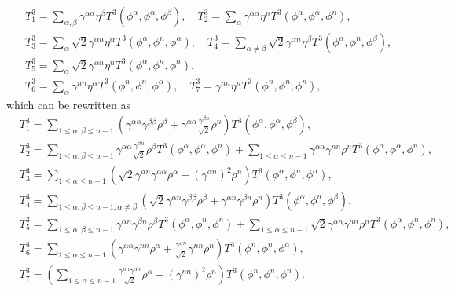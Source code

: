 \documentclass[12pt]{article}
\numberwithin{equation}{section}
\theoremstyle{plain}
\theoremstyle{definition}
\theoremstyle{remark}
\begin{document}
\begin{equation*}
\begin{split}
    & T^3_1 = \sum_{\alpha,\beta} \gamma^{\alpha \alpha} \eta^{\beta} T^3 (\phi^{\alpha}, \phi^{\alpha}, \phi^{\beta}), \quad  T^3_2 = \sum_{\alpha} \gamma^{\alpha \alpha} \eta^{n} T^3 (\phi^{\alpha}, \phi^{\alpha}, \phi^{n}), \\
    & T^3_3 = \sum_{\alpha}  \sqrt{2} \gamma^{\alpha n} \eta^{\alpha} T^3 (\phi^{\alpha}, \phi^{n}, \phi^{\alpha}), \quad T^3_4 = \sum_{\alpha \neq \beta}  \sqrt{2} \gamma^{\alpha n} \eta^{\beta} T^3 (\phi^{\alpha}, \phi^{n}, \phi^{\beta}), \\
    & T^3_5 = \sum_{\alpha} \sqrt{2} \gamma^{\alpha n} \eta^{n} T^3 (\phi^{\alpha}, \phi^{n}, \phi^{n}), \\
    & T^3_6 = \sum_{\alpha} \gamma^{n n} \eta^{\alpha} T^3 (\phi^{n}, \phi^{n}, \phi^{\alpha}), \quad  T^3_7 =  \gamma^{n n} \eta^{n} T^3 (\phi^{n}, \phi^{n}, \phi^{n}),    
\end{split}
\end{equation*}
which can be rewritten as
\begin{equation} \label{eq:T3_cal2}
\begin{split}
    & T^3_1 = \sum_{1\leq\alpha, \beta\leq n-1} \left(   \gamma^{\alpha \alpha} \gamma^{\beta \beta} \rho^{\beta} + \gamma^{\alpha \alpha} \frac{\gamma^{\beta n}}{\sqrt{2}} \rho^n \right)  T^3 (\phi^{\alpha}, \phi^{\alpha}, \phi^{\beta}), \\
    & T^3_2 = \sum_{1\leq\alpha, \beta\leq n-1} \gamma^{\alpha \alpha} \frac{\gamma^{\beta n}}{\sqrt{2}} \rho^{\beta} T^3 (\phi^{\alpha}, \phi^{\alpha}, \phi^{n}) + \sum_{1\leq\alpha\leq n-1} \gamma^{\alpha \alpha} \gamma^{n n} \rho^n   T^3 (\phi^{\alpha}, \phi^{\alpha}, \phi^{n}), \\
    & T^3_3 = \sum_{1\leq \alpha \leq n-1} \left(  \sqrt{2} \gamma^{\alpha n} \gamma^{\alpha \alpha} \rho^{\alpha} +  (\gamma^{\alpha n})^2  \rho^n  \right) T^3 (\phi^{\alpha}, \phi^{n}, \phi^{\alpha}),  \\ 
    & T^3_4 =  \sum_{1 \leq \alpha, \beta \leq n-1, \alpha \neq \beta} \left(  \sqrt{2} \gamma^{\alpha n} \gamma^{\beta \beta} \rho^{\beta} +  \gamma^{\alpha n} \gamma^{\beta n} \rho^n  \right) T^3 (\phi^{\alpha}, \phi^{n}, \phi^{\beta}), \\
    & T^3_5 =  \sum_{1\leq\alpha, \beta \leq n-1}  \gamma^{\alpha n} \gamma^{\beta n} \rho^{\beta} T^3 (\phi^{\alpha}, \phi^n, \phi^n) + \sum_{1\leq\alpha \leq n-1 } \sqrt{2} \gamma^{\alpha n} \gamma^{n n} \rho^n  T^3 (\phi^{\alpha}, \phi^n, \phi^n),   \\
    & T^3_6 = \sum_{1\leq\alpha \leq n-1} \left(  \gamma^{\alpha \alpha} \gamma^{n n} \rho^{\alpha} + \frac{\gamma^{\alpha n}}{\sqrt{2}} \gamma^{n n} \rho^n  \right) T^3 (\phi^{n}, \phi^{n}, \phi^{\alpha}),  \\
    & T^3_7 = \left( \sum_{1\leq\alpha \leq n-1}  \frac{\gamma^{n n} \gamma^{\alpha n}}{\sqrt{2}} \rho^{\alpha} + (\gamma^{n n})^2 \rho^n \right)  T^3 (\phi^{n}, \phi^{n}, \phi^{n}).
\end{split}
\end{equation}
\end{document}
